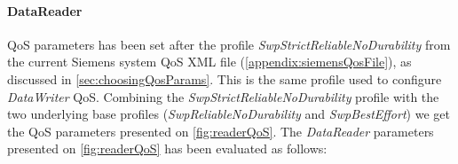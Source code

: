 \FloatBarrier

\paragraph{DataReader} QoS parameters has been set after the profile \textit{SwpStrictReliableNoDurability} from the current Siemens system QoS XML file (\cref{appendix:siemensQosFile}), as discussed in \cref{sec:choosingQosParams}. This is the same profile used to configure \textit{DataWriter} QoS. Combining the \textit{SwpStrictReliableNoDurability} profile with the two underlying base profiles (\textit{SwpReliableNoDurability} and \textit{SwpBestEffort}) we get the QoS parameters presented on \cref{fig:readerQoS}. The \textit{DataReader} parameters presented on \cref{fig:readerQoS} has been evaluated as follows:

